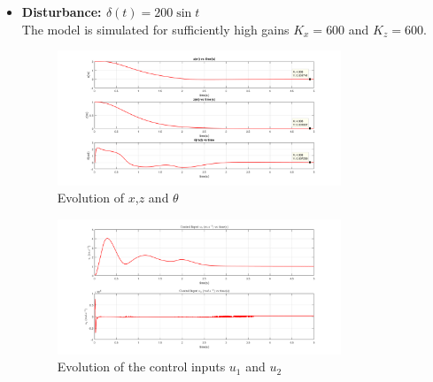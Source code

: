 \documentclass{article}
\begin{document}
\begin{itemize}
\item \textbf{Disturbance: $\delta(t)=200\sin t$}\\
 The model is simulated for sufficiently high gains $K_x=600$ and $K_z=600$.
 
\begin{figure}[H]
\centering
\includegraphics[width = 0.8\textwidth]{Figures/figure3.png}
\caption{Evolution of $x$,$z$ and $\theta$}
\label{fig:figure3}
\end{figure}

\begin{figure}[H]
\centering
\includegraphics[width = 0.8\textwidth]{Figures/figure4.png}
\caption{Evolution of the control inputs $u_1$ and $u_2$}
\label{fig:figure4}
\end{figure}


\end{itemize}
\end{document}

